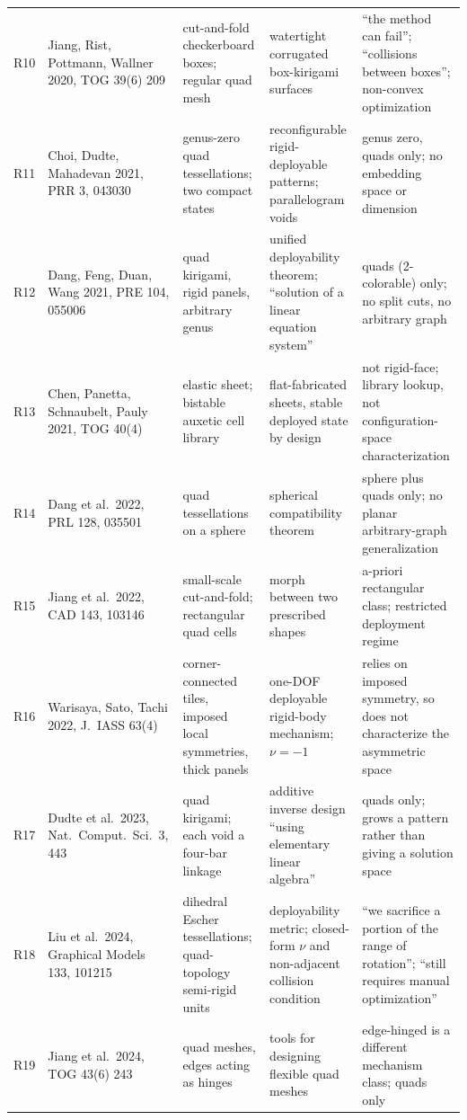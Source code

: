 \documentclass[10pt,a4paper]{article}
\begin{document}
\begin{longtable}{@{}p{6mm}p{36mm}p{40mm}p{38mm}p{40mm}@{}}
R10 & Jiang, Rist, Pottmann, Wallner 2020, TOG 39(6) 209 & cut-and-fold checkerboard boxes; regular quad mesh & watertight corrugated box-kirigami surfaces & ``the method can fail''; ``collisions between boxes''; non-convex optimization \\
R11 & Choi, Dudte, Mahadevan 2021, PRR 3, 043030 & genus-zero quad tessellations; two compact states & reconfigurable rigid-deployable patterns; parallelogram voids & genus zero, quads only; no embedding space or dimension \\
R12 & Dang, Feng, Duan, Wang 2021, PRE 104, 055006 & quad kirigami, rigid panels, arbitrary genus & unified deployability theorem; ``solution of a linear equation system'' & quads (2-colorable) only; no split cuts, no arbitrary graph \\
R13 & Chen, Panetta, Schnaubelt, Pauly 2021, TOG 40(4) & elastic sheet; bistable auxetic cell library & flat-fabricated sheets, stable deployed state by design & not rigid-face; library lookup, not configuration-space characterization \\
R14 & Dang et al.\ 2022, PRL 128, 035501 & quad tessellations on a sphere & spherical compatibility theorem & sphere plus quads only; no planar arbitrary-graph generalization \\
R15 & Jiang et al.\ 2022, CAD 143, 103146 & small-scale cut-and-fold; rectangular quad cells & morph between two prescribed shapes & a-priori rectangular class; restricted deployment regime \\
R16 & Warisaya, Sato, Tachi 2022, J.\ IASS 63(4) & corner-connected tiles, imposed local symmetries, thick panels & one-DOF deployable rigid-body mechanism; $\nu=-1$ & relies on imposed symmetry, so does not characterize the asymmetric space \\
R17 & Dudte et al.\ 2023, Nat.\ Comput.\ Sci.\ 3, 443 & quad kirigami; each void a four-bar linkage & additive inverse design ``using elementary linear algebra'' & quads only; grows a pattern rather than giving a solution space \\
R18 & Liu et al.\ 2024, Graphical Models 133, 101215 & dihedral Escher tessellations; quad-topology semi-rigid units & deployability metric; closed-form $\nu$ and non-adjacent collision condition & ``we sacrifice a portion of the range of rotation''; ``still requires manual optimization'' \\
R19 & Jiang et al.\ 2024, TOG 43(6) 243 & quad meshes, edges acting as hinges & tools for designing flexible quad meshes & edge-hinged is a different mechanism class; quads only \\

\end{longtable}
\end{document}
